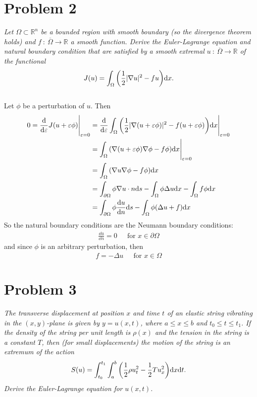 \documentclass[12pt]{article}
\theoremstyle{plain}
\newcommand{\E}{\varepsilon}
\begin{document}
\section*{Problem 2}
\emph{Let $\Omega \subset \mathbb{R}^n$ be a bounded region with smooth boundary (so the divergence theorem holds) and $f\ :\ \overline{\Omega} \rightarrow \mathbb{R}$ a smooth function.  Derive the Euler-Lagrange equation and natural boundary condition that are satisfied by a smooth extremal $u\ :\ \overline{\Omega} \rightarrow \mathbb{R}$ of the functional $$J(u) = \int_\Omega\qty(\frac{1}{2}|\nabla u|^2 - fu) \dd x.$$} \\

Let $\phi$ be a perturbation of $u$.  Then
\begin{align*}
    0 = \frac{\dd}{\dd \E}J(u + \E\phi)\Bigg|_{\E= 0} &= \frac{\dd}{\dd \E}\int_\Omega\qty(\frac{1}{2}|\nabla (u + \E\phi)|^2 - f(u + \E\phi))\dd x \Bigg|_{\E= 0} \\
    &= \int_\Omega \qty(\nabla (u + \E\phi) \nabla \phi - f \phi) \dd x \Bigg|_{\E= 0} \\
    &= \int_\Omega \qty(\nabla u \nabla \phi - f \phi) \dd x \\
    &= \int_{\partial\Omega}\phi\nabla u \cdot n \dd s - \int_\Omega \phi \Delta u \dd x - \int_\Omega f \phi \dd x \\
    &= \int_{\partial\Omega}\phi\frac{\dd u}{\dd n}\dd s - \int_{\Omega} \phi\qty(\Delta u + f)\dd x
\end{align*}
So the natural boundary conditions are the Neumann boundary conditions:
\begin{align*}
    \frac{\dd u}{\dd n} = 0\ \ \ \ \ \text{ for } x \in \partial \Omega
\end{align*}
and since $\phi$ is an arbitrary perturbation, then
\begin{align*}
    f = -\Delta u\ \ \ \ \ \text{ for } x \in \Omega
\end{align*}

\section*{Problem 3}
\emph{The transverse displacement at position $x$ and time $t$ of an elastic string vibrating in the $(x,y)$-plane is given by $y = u(x,t)$, where $a \leq x \leq b$ and $t_0 \leq t \leq t_1$.  If the density of the string per unit length is $\rho(x)$ and the tension in the string is a constant $T$, then (for small displacements) the motion of the string is an extremum of the action $$S(u) = \int_{t_0}^{t_1}\int_a^b \qty(\frac{1}{2}\rho u_t^2 - \frac{1}{2}T u_x^2)\dd x \dd t.$$  Derive the Euler-Lagrange equation for $u(x,t)$.} \\
\end{document}
